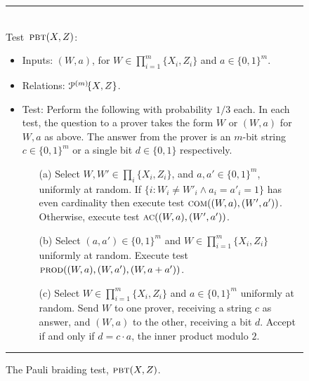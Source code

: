 \begin{figure}[H]
\rule[1ex]{\textwidth}{0.5pt}\\
\justifying
Test~$\textsc{pbt}(X,Z)$: %
\begin{itemize}
\item Inputs: $(W,a)$, for $W\in\prod_{i=1}^m\{X_i,Z_i\}$ and $a\in\{0,1\}^m$.
\item Relations: $\mathcal{P}^{(m)}\!\{X,Z\}$.  
\item Test: Perform the following with probability $1/3$ each. In each test, the question to a prover takes the form $W$ or $(W,a)$ for $W,a$ as above. The answer from the prover is an $m$-bit string $c\in\{0,1\}^m$ or a single bit $d\in\{0,1\}$ respectively.
\begin{enumerate}
\item[(a)] Select $W,W'\in \prod_i \{X_i,Z_i\}$, and $a,a'\in\{0,1\}^m$, uniformly at random. If $\{i: W_i\neq W'_i \wedge a_i=a'_i=1\}$ has even cardinality then execute test $\textsc{com}((W,a),(W',a'))$. Otherwise, execute test $\textsc{ac}((W,a),(W',a'))$. 
\item[(b)] Select $(a,a')\in\{0,1\}^m$ and $W\in\prod_{i=1}^m\{X_i,Z_i\}$ uniformly at random. Execute test $\textsc{prod}((W,a),(W,a'),(W,a+a'))$. 
\item[(c)] Select $W\in\prod_{i=1}^m\{X_i,Z_i\}$ and $a\in\{0,1\}^m$ uniformly at random. Send $W$ to one prover, receiving a string $c$ as answer, and $(W,a)$ to the other, receiving a bit $d$. Accept if and only if $d=c\cdot a$, the inner product modulo $2$.  
\end{enumerate}
\end{itemize}
\rule[2ex]{\textwidth}{0.5pt}\vspace{-.5cm}
\caption{The Pauli braiding test, $\textsc{pbt}(X,Z)$.}
\label{fig:pbt}
\end{figure}


